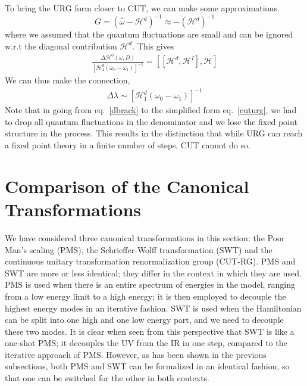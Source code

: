 To bring the URG form closer to CUT, we can make some approximations. 
\begin{equation}
G = \left(\hat \omega - \mathcal{H}^d\right)^{-1} \approx -\left(\mathcal{H}^d\right)^{-1}
\end{equation}
where we assumed that the quantum fluctuations are small and can be ignored w.r.t the diagonal contribution \(\mathcal{H}^d\). This gives
\begin{equation}\begin{aligned}
	\label{cuturg}
	\frac{\Delta \mathcal{H}^0(\omega,D)}{\left[\mathcal{H}^d_1\left(\omega_0 - \omega_1\right)\right]^{-1}} =  \left[\left[\mathcal{H}^d,\mathcal{H}^I\right],\mathcal{H}\right]
\end{aligned}\end{equation}
We can thus make the connection,
\begin{equation}\begin{aligned}
\Delta \lambda \sim \left[\mathcal{H}^d_1\left(\omega_0 - \omega_1\right)\right]^{-1}
\end{aligned}\end{equation}
Note that in going from eq.~\ref{dbrack} to the simplified form eq.~\ref{cuturg}, we had to drop all quantum fluctuations in the denominator and we lose the fixed point structure in the process. This results in the distinction that while URG can reach a fixed point theory in a finite number of steps, CUT cannot do so.
\section{Comparison of the Canonical Transformations}
We have considered three canonical transformations in this section: the Poor Man's scaling (PMS), the Schrieffer-Wolff transformation (SWT) and the continuous unitary transformation renormalization group (CUT-RG). PMS and SWT are more or less identical; they differ in the context in which they are used. PMS is used when there is an entire spectrum of energies in the model, ranging from a low energy limit to a high energy; it is then employed to decouple the highest energy modes in an iterative fashion. SWT is used when the Hamiltonian can be split into one high and one low energy part, and we need to decouple these two modes. It is clear when seen from this perspective that SWT is like a one-shot PMS; it decouples the UV from the IR in one step, compared to the iterative approach of PMS. However, as has been shown in the previous subsections, both PMS and SWT can be formalized in an identical fashion, so that one can be switched for the other in both contexts.

